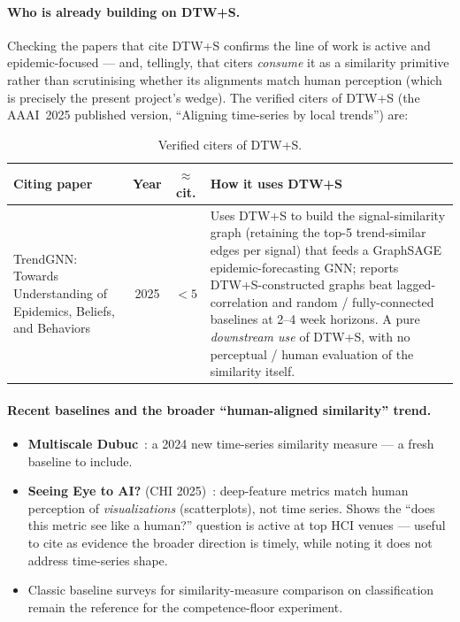\documentclass[11pt]{article}
\begin{document}
\paragraph{Who is already building on DTW+S.}
Checking the papers that cite DTW+S confirms the line of work is active and
epidemic-focused --- and, tellingly, that citers \emph{consume} it as a similarity
primitive rather than scrutinising whether its alignments match human perception (which
is precisely the present project's wedge). The verified citers of DTW+S (the AAAI~2025
published version, ``Aligning time-series by local trends'') are:
\begin{table}[H]
\centering
\renewcommand{\arraystretch}{1.3}
\begin{tabularx}{\textwidth}{p{} c c X}
\toprule
\textbf{Citing paper} & \textbf{Year} & \textbf{$\approx$cit.} & \textbf{How it uses DTW+S}\\
\midrule
TrendGNN: Towards Understanding of Epidemics, Beliefs, and Behaviors~\cite{trendgnn}
& 2025 & $<5$ &
Uses DTW+S to build the signal-similarity graph (retaining the top-5 trend-similar edges
per signal) that feeds a GraphSAGE epidemic-forecasting GNN; reports DTW+S-constructed
graphs beat lagged-correlation and random / fully-connected baselines at 2--4 week
horizons. A pure \emph{downstream use} of DTW+S, with no perceptual / human evaluation of
the similarity itself.\\
\bottomrule
\end{tabularx}
\caption{Verified citers of DTW+S.}
\end{table}

\paragraph{Recent baselines and the broader ``human-aligned similarity'' trend.}
\begin{itemize}[leftmargin=*]
  \item \textbf{Multiscale Dubuc}~\cite{dubuc2024}: a 2024 new time-series similarity
  measure --- a fresh baseline to include.
  \item \textbf{Seeing Eye to AI?} (CHI 2025)~\cite{seeingeye2025}: deep-feature metrics
  match human perception of \emph{visualizations} (scatterplots), not time series. Shows
  the ``does this metric see like a human?'' question is active at top HCI venues ---
  useful to cite as evidence the broader direction is timely, while noting it does not
  address time-series shape.
  \item Classic baseline surveys for similarity-measure comparison on
  classification~\cite{empirical2014} remain the reference for the competence-floor
  experiment.
\end{itemize}
\end{document}
